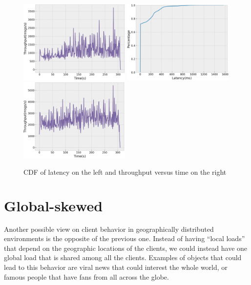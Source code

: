 \begin{figure}[H]
  \includegraphics[width=0.49\textwidth,height=\textheight,keepaspectratio]{img/local5_tp.png}
  \includegraphics[width=0.49\textwidth,height=\textheight,keepaspectratio]{img/local1_lat.png}
  \includegraphics[width=0.49\textwidth,height=\textheight,keepaspectratio]{img/local1_tp.png}
  \caption{ CDF of latency on the left and throughput versus time on the right }
  \label{fig:local50-performance}
\end{figure}

\section{Global-skewed}\label{sec:global-skewed}
Another possible view on client behavior in geographically distributed environments is the opposite of the previous one. Instead of having ``local loads'' that depend on the geographic locations of the clients, we could instead have one global load that is shared among all the clients. Examples of objects that could lead to this behavior are viral news that could interest the whole world, or famous people that have fans from all across the globe.

